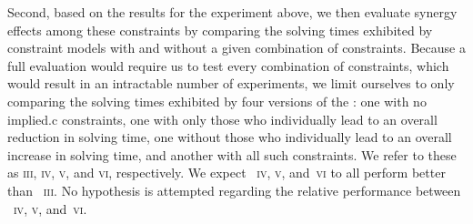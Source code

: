 \def\modelC{\textsc{iii}}
\def\modelD{\textsc{iv}}
\def\modelE{\textsc{v}}
\def\modelF{\textsc{vi}}

Second, based on the results for the experiment above, we then evaluate synergy
effects among these \glspl{constraint} by comparing the solving times exhibited
by \glspl{constraint model} with and without a given combination of
\glspl{constraint}.
%
Because a full evaluation would require us to test every combination of
\glspl{constraint}, which would result in an intractable number of experiments,
we limit ourselves to only comparing the solving times exhibited by four
versions of the : one with no \gls{implied.c}
\glspl{constraint}, one with only those who individually lead to an overall
reduction in solving time, one without those who individually lead to an overall
increase in solving time, and another with all such \glspl{constraint}.
%
We refer to these  as \modelC, \modelD, \modelE,
and \modelF, respectively.
%
We expect ~\modelD, \modelE, and~\modelF{}
to all perform better than ~\modelC.
%
No hypothesis is attempted regarding the relative performance between
~\modelD, \modelE, and~\modelF.



